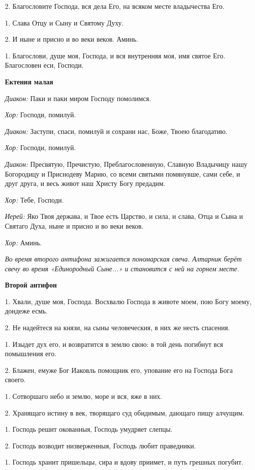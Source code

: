 2. Благословите Господа, вся дела Его, на всяком месте владычества Его. 

1. Слава Отцу и Сыну и Святому Духу. 

2. И ныне и присно и во веки веков. Аминь. 

1. Благослови, душе моя, Господа, и вся внутренняя моя, имя святое Его. Благословен еси, Господи.

{\bfseries Ектения малая }

{\itshape Диакон:} Паки и паки миром Господу помолимся. 

{\itshape Хор:} Господи, помилуй. 

{\itshape Диакон:} Заступи, спаси, помилуй и сохрани нас, Боже, Твоею благодатию. 

{\itshape Хор:} Господи, помилуй. 

{\itshape Диакон:} Пресвятую, Пречистую, Преблагословенную, Славную Владычицу нашу Богородицу и Приснодеву Марию, со всеми святыми помянувше, сами себе, и друг друга, и весь живот наш Христу Богу предадим. 

{\itshape Хор:} Тебе, Господи. 

{\itshape Иерей:} Яко Твоя держава, и Твое есть Царство, и сила, и слава, Отца и Сына и Святаго Духа, ныне и присно и во веки веков. 

{\itshape Хор:} Аминь. 

{\itshape Во время второго антифона зажигается пономарская свеча. Алтарник берёт свечу во время «Единородный Сыне...» и становится с ней на горнем месте.}

{\bfseries Второй антифон }

1. Хвали, душе моя, Господа. Восхвалю Господа в животе моем, пою Богу моему, дондеже есмь. 

2. Не надейтеся на князи, на сыны человеческия, в них же несть спасения. 

1. Изыдет дух его, и возвратится в землю свою: в той день погибнут вся помышления его. 

2. Блажен, емуже Бог Иаковль помощник его, упование его на Господа Бога своего. 

1. Сотворшаго небо и землю, море и вся, яже в них. 

2. Хранящаго истину в век, творящаго суд обидимым, дающаго пищу алчущим. 

1. Господь решит окованныя, Господь умудряет слепцы. 

2. Господь возводит низверженныя, Господь любит праведники. 

1. Господь хранит пришельцы, сира и вдову приимет, и путь грешных погубит. 

